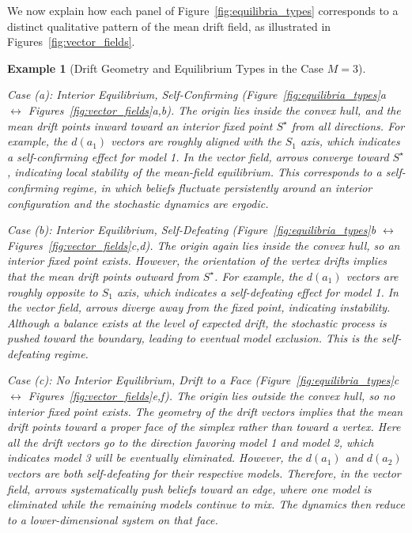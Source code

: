 \documentclass[12pt]{article}
\newtheorem{example}{Example}
\begin{document}
We now explain how each panel of Figure~\ref{fig:equilibria_types} corresponds to a distinct qualitative pattern of the mean drift field, as illustrated in Figures~\ref{fig:vector_fields}.

\begin{example}[Drift Geometry and Equilibrium Types in the Case $M=3$]
\label{ex:drift-geometry-and-equilibrium-types}

\textit{Case (a): Interior Equilibrium, Self-Confirming} (Figure~\ref{fig:equilibria_types}a $\leftrightarrow$ Figures~\ref{fig:vector_fields}a,b).
The origin lies inside the convex hull, and the mean drift points inward toward an interior fixed point $S^\star$ from all directions. For example, the $d(a_1)$ vectors are roughly aligned with the $S_1$ axis, which indicates a self-confirming effect for model 1. In the vector field, arrows converge toward $S^\star$, indicating local stability of the mean-field equilibrium.
This corresponds to a \emph{self-confirming} regime, in which beliefs fluctuate persistently around an interior configuration and the stochastic dynamics are ergodic.

\textit{Case (b): Interior Equilibrium, Self-Defeating} (Figure~\ref{fig:equilibria_types}b $\leftrightarrow$ Figures~\ref{fig:vector_fields}c,d).
The origin again lies inside the convex hull, so an interior fixed point exists. 
However, the orientation of the vertex drifts implies that the mean drift points outward from $S^\star$. For example, the $d(a_1)$ vectors are roughly opposite to $S_1$ axis, which indicates a self-defeating effect for model 1. In the vector field, arrows diverge away from the fixed point, indicating instability.
Although a balance exists at the level of expected drift, the stochastic process is pushed toward the boundary, leading to eventual model exclusion.
This is the \emph{self-defeating} regime.

\textit{Case (c): No Interior Equilibrium, Drift to a Face} (Figure~\ref{fig:equilibria_types}c $\leftrightarrow$ Figures~\ref{fig:vector_fields}e,f).
The origin lies outside the convex hull, so no interior fixed point exists.
The geometry of the drift vectors implies that the mean drift points toward a proper face of the simplex rather than toward a vertex. Here all the drift vectors go to the direction favoring model 1 and model 2, which indicates model 3 will be eventually eliminated. However, the $d(a_1)$ and $d(a_2)$ vectors are both self-defeating for their respective models. Therefore, in the vector field, arrows systematically push beliefs toward an edge, where one model is eliminated while the remaining models continue to mix.
The dynamics then reduce to a lower-dimensional system on that face.


\end{example}
\end{document}
